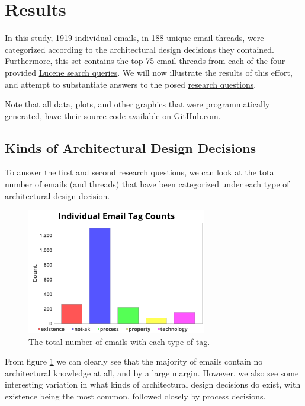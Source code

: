 \documentclass[a4paper, 12pt]{article}
\begin{document}
\section{Results}
	In this study, 1919 individual emails, in 188 unique email threads, were categorized according to the architectural design decisions they contained. Furthermore, this set contains the top 75 email threads from each of the four provided \hyperref[sec:queries]{Lucene search queries}. We will now illustrate the results of this effort, and attempt to substantiate answers to the posed \hyperref[sec:research-questions]{research questions}.
	
	\footnotesize
	Note that all data, plots, and other graphics that were programmatically generated, have their \href{https://github.com/ArchitecturalKnowledgeAnalysis/EmailDatasetReportGen}{source code available on GitHub.com}.
	\normalsize
	
	\subsection{Kinds of Architectural Design Decisions}
		To answer the first and second research questions, we can look at the total number of emails (and threads) that have been categorized under each type of \hyperref[sec:design-decisions]{architectural design decision}.
		
		\begin{figure}[H]
			\centering
			\includegraphics[width=0.7\textwidth]{report/email_tag_counts.png}
			\caption{The total number of emails with each type of tag.}
			\label{fig:emailtagcount}
		\end{figure}
	
		From figure \ref{fig:emailtagcount} we can clearly see that the majority of emails contain no architectural knowledge at all, and by a large margin. However, we also see some interesting variation in what kinds of architectural design decisions do exist, with existence being the most common, followed closely by process decisions.
	
\end{document}
